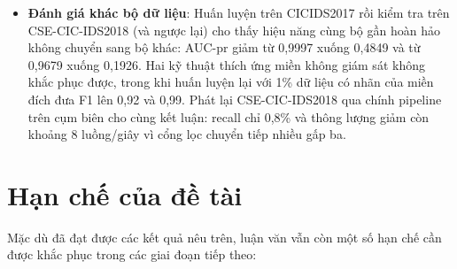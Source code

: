 \begin{itemize}
    \item \textbf{Đánh giá khác bộ dữ liệu}: Huấn luyện trên CICIDS2017 rồi kiểm tra trên CSE-CIC-IDS2018 (và ngược lại) cho thấy hiệu năng cùng bộ gần hoàn hảo không chuyển sang bộ khác: AUC-\ac{pr} giảm từ 0{,}9997 xuống 0{,}4849 và từ 0{,}9679 xuống 0{,}1926. Hai kỹ thuật thích ứng miền không giám sát không khắc phục được, trong khi huấn luyện lại với 1\% dữ liệu có nhãn của miền đích đưa F1 lên 0{,}92 và 0{,}99. Phát lại CSE-CIC-IDS2018 qua chính pipeline trên cụm biên cho cùng kết luận: recall chỉ 0{,}8\% và thông lượng giảm còn khoảng 8 luồng/giây vì cổng lọc chuyển tiếp nhiều gấp ba.
\end{itemize}

\section{Hạn chế của đề tài}
Mặc dù đã đạt được các kết quả nêu trên, luận văn vẫn còn một số hạn chế cần được khắc phục trong các giai đoạn tiếp theo:
